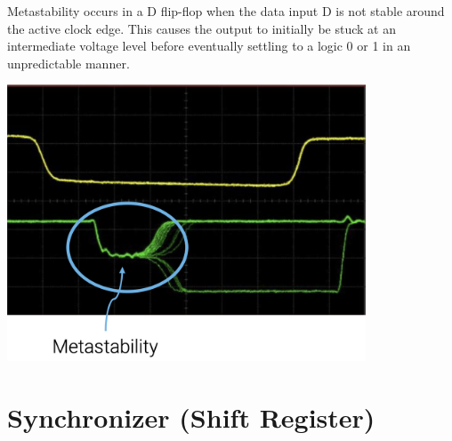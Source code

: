\documentclass[12pt,openany]{book}
\begin{document}
\begin{minipage}{0.4\textwidth}

\begin{justify}
		Metastability occurs in a D flip-flop when the data input D is not stable around the active clock edge. \newline  \vspace*{5px }This causes the output to initially be stuck at an intermediate voltage level before eventually settling to a logic 0 or 1 in an unpredictable manner.
\end{justify}
\end{minipage}
\hfill
\hspace*{20px}
\vline
\hfill
\begin{minipage}{0.5\textwidth}
	\centering
	\includegraphics[width=0.8\textwidth]{circuits/15.2.png}
\end{minipage}


\section{Synchronizer (Shift Register)}
\end{document}
